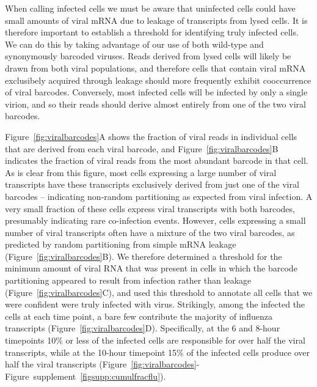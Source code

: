 \documentclass[9pt,lineno]{elife}
\begin{document}
When calling infected cells we must be aware that uninfected cells could have small amounts of viral mRNA due to leakage of transcripts from lysed cells.
It is therefore important to establish a threshold for identifying truly infected cells.
We can do this by taking advantage of our use of both wild-type and synonymously barcoded viruses.
Reads derived from lysed cells will likely be drawn from both viral populations, and therefore cells that contain viral mRNA exclusibely acquired  through leakage should more frequently exhibit cooccurrence of viral barcodes.
Conversely, most infected cells will be infected by only a single virion, and so their reads should derive almost entirely from one of the two viral barcodes. 

Figure~\ref{fig:viralbarcodes}A shows the fraction of viral reads in individual cells that are derived from each viral barcode, and Figure~\ref{fig:viralbarcodes}B indicates the fraction of viral reads from the most abundant barcode in that cell.
As is clear from this figure, most cells expressing a large number of viral transcripts have these transcripts exclusively derived from just one of the viral barcodes -- indicating non-random partitioning as expected from viral infection.
A very small fraction of these cells express viral transcripts with both barcodes, presumably indicating rare co-infection events.
However, cells expressing a small number of viral transcripts often have a mixture of the two viral barcodes, as predicted by random partitioning from simple mRNA leakage (Figure~\ref{fig:viralbarcodes}B).
We therefore determined a threshold for the minimum amount of viral RNA that was present in cells in which the barcode partitioning appeared to result from infection rather than leakage (Figure~\ref{fig:viralbarcodes}C), and used this threshold to annotate all cells that we were confident were truly infected with virus.
Strikingly, among the infected the cells at each time point, a bare few contribute the majority of influenza transcripts (Figure~\ref{fig:viralbarcodes}D).
Specifically, at the 6 and 8-hour timepoints 10\% or less of the infected cells are responsible for over half the viral transcripts, while at the 10-hour timepoint 15\% of the infected cells produce over half the viral transcripts (Figure~\ref{fig:viralbarcodes}-Figure~supplement~\ref{figsupp:cumulfracflu}).
\end{document}
